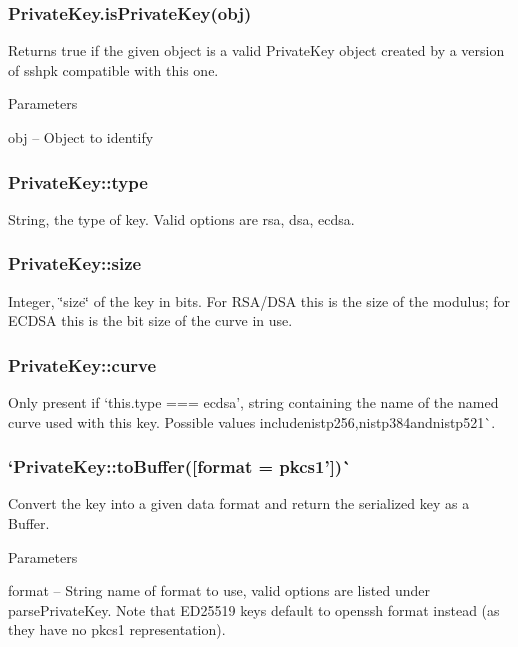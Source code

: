 \subsubsection*{{\ttfamily Private\+Key.\+is\+Private\+Key(obj)}}

Returns {\ttfamily true} if the given object is a valid {\ttfamily Private\+Key} object created by a version of {\ttfamily sshpk} compatible with this one.

Parameters


\begin{DoxyItemize}
\item {\ttfamily obj} -- Object to identify
\end{DoxyItemize}

\subsubsection*{{\ttfamily Private\+Key\+::type}}

String, the type of key. Valid options are {\ttfamily rsa}, {\ttfamily dsa}, {\ttfamily ecdsa}.

\subsubsection*{{\ttfamily Private\+Key\+::size}}

Integer, \char`\"{}size\char`\"{} of the key in bits. For R\+S\+A/\+D\+SA this is the size of the modulus; for E\+C\+D\+SA this is the bit size of the curve in use.

\subsubsection*{{\ttfamily Private\+Key\+::curve}}

Only present if `this.\+type === \textquotesingle{}ecdsa'{\ttfamily , string containing the name of the named curve used with this key. Possible values include}nistp256{\ttfamily ,}nistp384{\ttfamily  and}nistp521\`{}.

\subsubsection*{`Private\+Key\+::to\+Buffer(\mbox{[}format = \textquotesingle{}pkcs1'\mbox{]})\`{}}

Convert the key into a given data format and return the serialized key as a Buffer.

Parameters


\begin{DoxyItemize}
\item {\ttfamily format} -- String name of format to use, valid options are listed under {\ttfamily parse\+Private\+Key}. Note that E\+D25519 keys default to {\ttfamily openssh} format instead (as they have no {\ttfamily pkcs1} representation).
\end{DoxyItemize}

